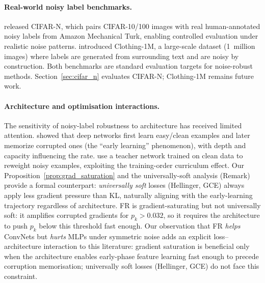 \documentclass[11pt]{article}
\begin{document}
\paragraph{Real-world noisy label benchmarks.}
\citet{wei2022learning} released CIFAR-N, which pairs CIFAR-10/100 images with
real human-annotated noisy labels from Amazon Mechanical Turk, enabling
controlled evaluation under realistic noise patterns.
\citet{xiao2015learning} introduced Clothing-1M, a large-scale dataset
(1~million images) where labels are generated from surrounding text and are
noisy by construction.
Both benchmarks are standard evaluation targets for noise-robust methods.
Section~\ref{sec:cifar_n} evaluates CIFAR-N; Clothing-1M remains future work.

\paragraph{Architecture and optimisation interactions.}
The sensitivity of noisy-label robustness to architecture has received
limited attention.
\citet{arpit2017memorization} showed that deep networks first learn
easy/clean examples and later memorize corrupted ones (the ``early
learning'' phenomenon), with depth and capacity influencing the rate.
\citet{jiang2018mentornet} use a teacher network trained on clean data to
reweight noisy examples, exploiting the training-order curriculum effect.
Our Proposition~\ref{prop:grad_saturation} and the universally-soft analysis (Remark) provide a formal counterpart:
\emph{universally soft} losses (Hellinger, GCE) always apply less gradient pressure than KL,
naturally aligning with the early-learning trajectory regardless of architecture.
FR is gradient-saturating but not universally soft: it amplifies corrupted gradients for $p_k>0.032$,
so it requires the architecture to push $p_k$ below this threshold fast enough.
Our observation that FR \emph{helps} ConvNets but \emph{hurts} MLPs under
symmetric noise adds an explicit loss--architecture interaction to this
literature: gradient saturation is beneficial only when the architecture
enables early-phase feature learning fast enough to precede corruption memorisation;
universally soft losses (Hellinger, GCE) do not face this constraint.
\end{document}
